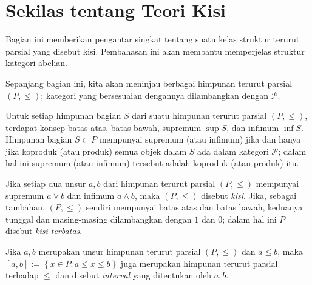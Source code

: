 
\section{Sekilas tentang Teori Kisi}\label{sec:lattices}
\hypertarget{o014.aljabr2.chapter2.glimpse-of-lattice-theory}{ }

Bagian ini memberikan pengantar singkat tentang suatu kelas struktur terurut
parsial yang disebut kisi. Pembahasan ini akan membantu memperjelas struktur
kategori abelian.

Sepanjang bagian ini, kita akan meninjau berbagai himpunan terurut parsial
$(P, \leq)$; kategori yang bersesuaian dengannya dilambangkan dengan
$\mathcal{P}$.

Untuk setiap himpunan bagian $S$ dari suatu himpunan terurut parsial
$(P, \leq)$, terdapat konsep batas atas, batas bawah, supremum $\sup S$, dan
infimum $\inf S$. Himpunan bagian $S \subset P$ mempunyai supremum (atau
infimum) jika dan hanya jika koproduk (atau produk) semua objek dalam $S$
ada dalam kategori $\mathcal{P}$; dalam hal ini supremum (atau infimum)
tersebut adalah koproduk (atau produk) itu.

\begin{definisi}\label{def:lattice-order}
	Jika setiap dua unsur $a,b$ dari himpunan terurut parsial $(P, \leq)$
	mempunyai supremum $a \vee b$ dan infimum $a \wedge b$, maka $(P, \leq)$
	disebut \emph{kisi}. Jika, sebagai tambahan, $(P, \leq)$ sendiri mempunyai
	batas atas dan batas bawah, keduanya tunggal dan masing-masing dilambangkan
	dengan $1$ dan $0$; dalam hal ini $P$ disebut \emph{kisi terbatas}.

	Jika $a,b$ merupakan unsur himpunan terurut parsial $(P, \leq)$ dan
	$a \leq b$, maka $[a, b] := \left\{x \in P: a \leq x \leq b \right\}$ juga
	merupakan himpunan terurut parsial terhadap $\leq$ dan disebut
	\emph{interval} yang ditentukan oleh $a,b$.
\end{definisi}

